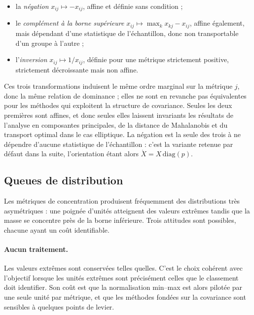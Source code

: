 \documentclass[11pt,a4paper]{article}
\theoremstyle{definition}
\theoremstyle{remark}
\newcommand{\Xor}{\mathring{X}}
\begin{document}
\medskip

\begin{itemize}[nosep,leftmargin=1.4em]
  \item la \emph{négation} $x_{ij} \mapsto -x_{ij}$, affine et définie sans condition ;
  \item le \emph{complément à la borne supérieure}
  $x_{ij} \mapsto \max_k x_{kj} - x_{ij}$, affine également, mais dépendant d'une
  statistique de l'échantillon, donc non transportable d'un groupe à l'autre ;
  \item l'\emph{inversion} $x_{ij} \mapsto 1/x_{ij}$, définie pour une métrique
  strictement positive, strictement décroissante mais non affine.
\end{itemize}

\bigskip

Ces trois transformations induisent le même ordre marginal sur la métrique $j$, donc la
même relation de dominance ; elles ne sont en revanche pas équivalentes pour les méthodes
qui exploitent la structure de covariance. Seules les deux premières sont affines, et donc
seules elles laissent invariants les résultats de l'analyse en composantes principales, de
la distance de Mahalanobis et du transport optimal dans le cas elliptique. La négation est
la seule des trois à ne dépendre d'aucune statistique de l'échantillon : c'est la variante
retenue par défaut dans la suite, l'orientation étant alors $\Xor = X\,\mathrm{diag}(p)$.

\bigskip

\subsection{Queues de distribution}
\label{sec:queues}

\medskip

Les métriques de concentration produisent fréquemment des distributions très
asymétriques : une poignée d'unités atteignent des valeurs extrêmes tandis que la masse se
concentre près de la borne inférieure. Trois attitudes sont possibles, chacune ayant un
coût identifiable.

\medskip

\paragraph{Aucun traitement.} Les valeurs extrêmes sont conservées telles quelles. C'est
le choix cohérent avec l'objectif lorsque les unités extrêmes sont précisément celles que
le classement doit identifier. Son coût est que la normalisation min--max est alors pilotée
par une seule unité par métrique, et que les méthodes fondées sur la covariance sont
sensibles à quelques points de levier.
\end{document}
